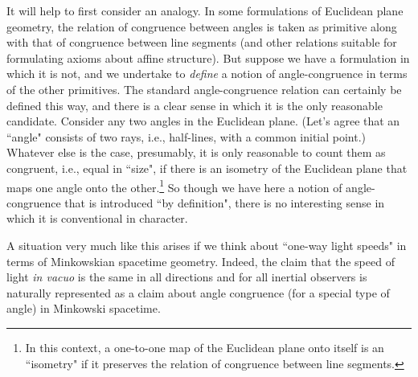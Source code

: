 \documentclass [12] {article}
\theoremstyle{plain}
\numberwithin{figure}{subsection}
\numberwithin{proposition}{subsection}
\begin{document}
It will help to first consider an analogy.  In some formulations of Euclidean plane geometry,  the relation of congruence between angles is taken as primitive along with that of congruence between line segments (and other relations suitable for formulating axioms about affine structure).  But suppose we have a formulation in which it is not, and we undertake to \emph{define} a notion of angle-congruence in terms of the other primitives.  The standard angle-congruence relation can certainly be defined this  way, and there is a clear sense in which it is the only reasonable candidate.  Consider any two angles in the Euclidean plane.  (Let's agree that an ``angle" consists of two rays, i.e.,  half-lines, with a common initial point.)  Whatever else is the case, presumably, it is only reasonable to count them as congruent, i.e., equal in ``size",   if there is an isometry of the Euclidean plane  that maps one angle onto the other.\footnote{In this context, a one-to-one map of  the Euclidean plane onto itself is an ``isometry"  if it preserves the relation of congruence between line segments.}  So though we have here a notion of angle-congruence that is introduced ``by definition", there is no interesting sense in which it is conventional in character.

A situation very much like this arises if we think about  ``one-way light speeds" in terms of Minkowskian spacetime geometry. Indeed, the claim that the speed of light \emph{in vacuo} is the same in all directions and for all inertial observers is naturally represented as a claim about angle congruence (for a special type of angle) in Minkowski spacetime.  
\end{document}
